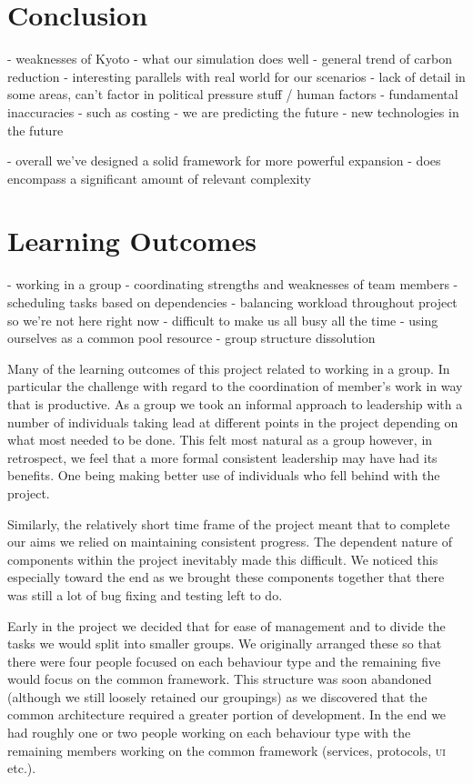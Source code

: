 \section{Conclusion}

- weaknesses of Kyoto
- what our simulation does well
- general trend of carbon reduction
- interesting parallels with real world for our scenarios
- lack of detail in some areas, can't factor in political pressure stuff / human factors
- fundamental inaccuracies - such as costing
- we are predicting the future
- new technologies in the future

- overall we've designed a solid framework for more powerful expansion
- does encompass a significant amount of relevant complexity

\section{Learning Outcomes}

- working in a group
- coordinating strengths and weaknesses of team members
- scheduling tasks based on dependencies
- balancing workload throughout project so we're not here right now
- difficult to make us all busy all the time
- using ourselves as a common pool resource
- group structure dissolution

Many of the learning outcomes of this project related to working in a group. In particular the challenge with regard to the coordination of member's work in way that is productive. As a group we took an informal approach to leadership with a number of individuals taking lead at different points in the project depending on what most needed to be done. This felt most natural as a group however, in retrospect, we feel that a more formal consistent leadership may have had its benefits. One being making better use of individuals who fell behind with the project.

Similarly, the relatively short time frame of the project meant that to complete our aims we relied on maintaining consistent progress. The dependent nature of components within the project inevitably made this difficult. We noticed this especially toward the end as we brought these components together that there was still a lot of bug fixing and testing left to do.

Early in the project we decided that for ease of management and to divide the tasks we would split into smaller groups. We originally arranged these so that there were four people focused on each behaviour type and the remaining five would focus on the common framework. This structure was soon abandoned (although we still loosely retained our groupings) as we discovered that the common architecture required a greater portion of development. In the end we had roughly one or two people working on each behaviour type with the remaining members working on the common framework (services, protocols, \textsc{ui} etc.). 

